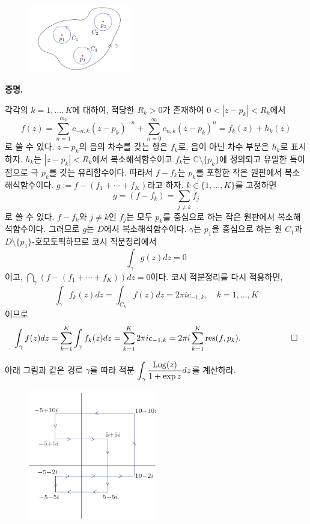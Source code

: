 \begin{figure}[h!]
\begin{center}
\includegraphics[width=0.4\textwidth]{./SaltChapter/figs/fig-4-0-10}
\end{center}
\end{figure}

{\bf 증명.}

각각의 $k=1,\ldots, K$에 대하여,
적당한 $R_k>0$가 존재하여 $0<|z-p_k|<R_k$에서
\[
f(z) = \sum_{n=1}^{m_k} c_{-n,k} (z-p_k)^{-n}
+ \sum_{n=0}^\infty c_{n,k} (z-p_k)^n = f_k(z) + h_k(z)
\]
로 쓸 수 있다. $z-p_k$의 음의 차수를 갖는 항은 $f_k$로, 
음이 아닌 차수 부분은 $h_k$로 표시하자.
$h_k$는 $|z-p_k|<R_k$에서 복소해석함수이고
$f_k$는 $\mathbb C\setminus\{p_k\}$에 정의되고
유일한 특이점으로 극 $p_k$를 갖는 유리함수이다.
따라서 $f-f_k$는 $p_k$를 포함한 작은 원판에서 복소해석함수이다.
$g:= f - (f_1+\cdots + f_K)$라고 하자.
$k\in \{1,\ldots, K\}$를 고정하면
\[
g = (f-f_k) = \sum_{j\ne k} f_j
\]
로 쓸 수 있다.
$f-f_k$와 $j\ne k$인 $f_j$는 모두 $p_k$를 중심으로 하는 작은 원판에서
복소해석함수이다. 그러므로 $g$는 $D$에서 복소해석함수이다.
$\gamma$는  $p_1$을 중심으로 하는 원 $C_1$과 $D\setminus\{p_1\}$-호모토픽하므로
코시 적분정리에서
\[
\int_\gamma g(z)dz  = 0
\]
이고, $\dint_\gamma \left( f - (f_1+\cdots + f_K) \right) dz = 0$이다.
코시 적분정리를 다시 적용하면,
\[
\int_\gamma f_k(z)dz = \int_{C_k} f(z)dz = 2\pi i c_{-1,k},
\quad k=1,\ldots, K
\]
이므로
\[
\int_\gamma f(z)dz  = \sum_{k=1}^K \int_\gamma f_k(z)dz
= \sum_{k=1}^K 2\pi i c_{-1,k} = 2\pi i \sum_{k=1}^K \mathop{\mathrm{res}}(f,p_k).
\qquad\qquad\qquad\square
\]

\begin{salt_exercise}\label{ex-4-40}
아래 그림과 같은 경로 $\gamma$를 따라
적분 $\displaystyle\int_\gamma \displaystyle\frac{\mathop{\mathrm{Log}}(z)}{1+\exp z} dz$를 계산하라.
\begin{figure}[h!]
\begin{center}
\includegraphics[width=0.5\textwidth]{./SaltChapter/figs/fig-4-0-11}
\end{center}
\end{figure}
\end{salt_exercise}

